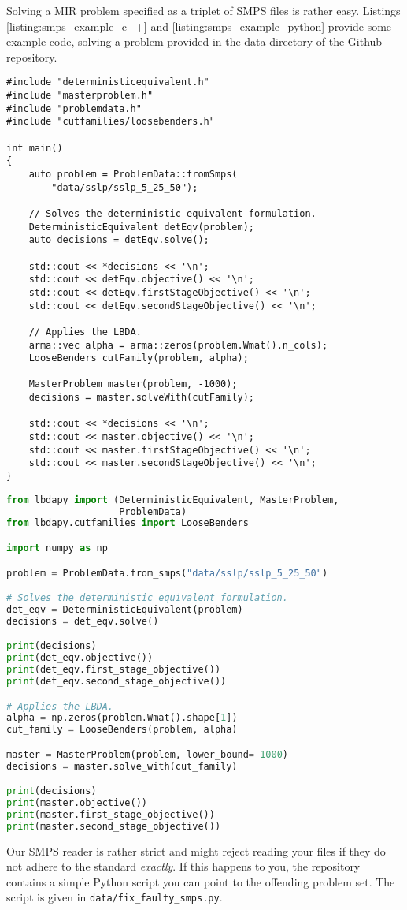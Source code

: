 \documentclass[12pt, english]{article}
\begin{document}
Solving a MIR problem specified as a triplet of SMPS files is rather easy. Listings \ref{listing:smps_example_c++} and \ref{listing:smps_example_python} provide some example code, solving a problem provided in the data directory of the Github repository.
\begin{lstlisting}[caption={Solving SMPS input in C++.},
                   label={listing:smps_example_c++}]
#include "deterministicequivalent.h"
#include "masterproblem.h"
#include "problemdata.h"
#include "cutfamilies/loosebenders.h"

int main()
{
	auto problem = ProblemData::fromSmps(
		"data/sslp/sslp_5_25_50");
	
	// Solves the deterministic equivalent formulation.
	DeterministicEquivalent detEqv(problem);
	auto decisions = detEqv.solve();
	
	std::cout << *decisions << '\n';
	std::cout << detEqv.objective() << '\n';
	std::cout << detEqv.firstStageObjective() << '\n';
	std::cout << detEqv.secondStageObjective() << '\n';
	
	// Applies the LBDA.
	arma::vec alpha = arma::zeros(problem.Wmat().n_cols);
	LooseBenders cutFamily(problem, alpha);
	
	MasterProblem master(problem, -1000);
	decisions = master.solveWith(cutFamily);
	
	std::cout << *decisions << '\n';
	std::cout << master.objective() << '\n';
	std::cout << master.firstStageObjective() << '\n';
	std::cout << master.secondStageObjective() << '\n';
}
\end{lstlisting}
\begin{lstlisting}[caption={Solving SMPS input in Python.},
                   label={listing:smps_example_python},
                   language={Python}]
from lbdapy import (DeterministicEquivalent, MasterProblem, 
                    ProblemData)
from lbdapy.cutfamilies import LooseBenders

import numpy as np

problem = ProblemData.from_smps("data/sslp/sslp_5_25_50")

# Solves the deterministic equivalent formulation.
det_eqv = DeterministicEquivalent(problem)
decisions = det_eqv.solve()

print(decisions)
print(det_eqv.objective())
print(det_eqv.first_stage_objective())
print(det_eqv.second_stage_objective())

# Applies the LBDA.
alpha = np.zeros(problem.Wmat().shape[1])
cut_family = LooseBenders(problem, alpha)

master = MasterProblem(problem, lower_bound=-1000)
decisions = master.solve_with(cut_family)

print(decisions)
print(master.objective())
print(master.first_stage_objective())
print(master.second_stage_objective())
\end{lstlisting}
Our SMPS reader is rather strict and might reject reading your files if they do not adhere to the standard \textit{exactly}. If this happens to you, the repository contains a simple Python script you can point to the offending problem set. The script is given in \texttt{data/fix\_faulty\_smps.py}.
\end{document}
